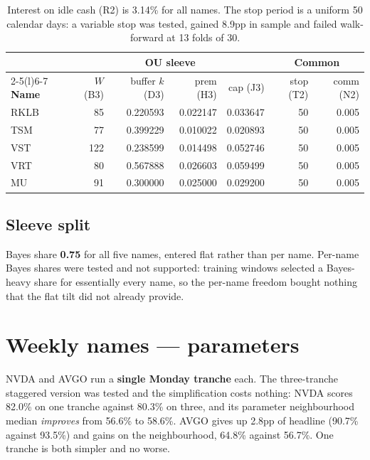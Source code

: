 \documentclass[11pt]{article}
\begin{document}
\begin{table}[H]\centering\footnotesize
\setlength{\tabcolsep}{5pt}
\begin{tabular}{lrrrrrr}
\toprule
& \multicolumn{4}{c}{\textbf{OU sleeve}} & \multicolumn{2}{c}{\textbf{Common}}\\
\cmidrule(lr){2-5}\cmidrule(l){6-7}
\textbf{Name} & $W$ (B3) & buffer $k$ (D3) & prem (H3) & cap (J3) & stop (T2) & comm (N2)\\
\midrule
\rowcolor{bckeep} RKLB & 85  & 0.220593 & 0.022147 & 0.033647 & 50 & 0.005\\
TSM  & 77  & 0.399229 & 0.010022 & 0.020893 & 50 & 0.005\\
\rowcolor{bckeep} VST  & 122 & 0.238599 & 0.014498 & 0.052746 & 50 & 0.005\\
VRT  & 80  & 0.567888 & 0.026603 & 0.059499 & 50 & 0.005\\
\rowcolor{bckeep} MU   & 91  & 0.300000 & 0.025000 & 0.029200 & 50 & 0.005\\
\bottomrule
\end{tabular}
\caption{Interest on idle cash (R2) is 3.14\% for all names. The stop period is a uniform 50
calendar days: a variable stop was tested, gained 8.9pp in sample and failed walk-forward at
13 folds of 30.}
\end{table}

\subsection{Sleeve split}

Bayes share \textbf{0.75} for all five names, entered flat rather than per name. Per-name Bayes
shares were tested and not supported: training windows selected a Bayes-heavy share for
essentially every name, so the per-name freedom bought nothing that the flat tilt did not
already provide.

\section{Weekly names --- parameters}

NVDA and AVGO run a \textbf{single Monday tranche} each. The three-tranche staggered version was
tested and the simplification costs nothing: NVDA scores 82.0\% on one tranche against 80.3\% on
three, and its parameter neighbourhood median \emph{improves} from 56.6\% to 58.6\%. AVGO gives
up 2.8pp of headline (90.7\% against 93.5\%) and gains on the neighbourhood, 64.8\% against
56.7\%. One tranche is both simpler and no worse.
\end{document}
